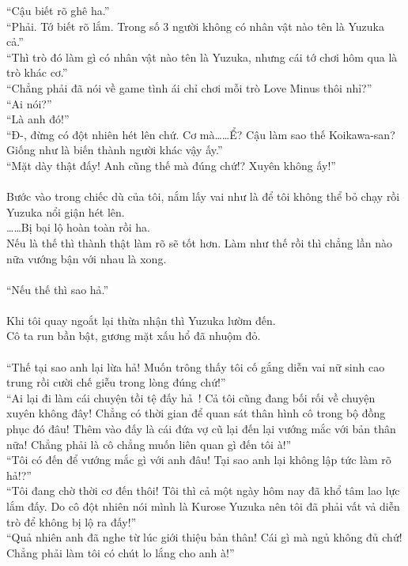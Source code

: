 \documentclass[12pt,a4paper, twosides]{book}
\begin{document}
“Cậu biết rõ ghê ha.”\\
“Phải. Tớ biết rõ lắm. Trong số 3 người không có nhân vật nào tên là Yuzuka cả.”\\
“Thì trò đó làm gì có nhân vật nào tên là Yuzuka, nhưng cái tớ chơi hôm qua là trò khác cơ.”\\
“Chẳng phải đã nói về game tình ái chỉ chơi mỗi trò Love Minus thôi nhỉ?”\\
“Ai nói?”\\
“Là anh đó!”\\
“Đ-, đừng có đột nhiên hét lên chứ. Cơ mà……Ể? Cậu làm sao thế Koikawa-san? Giống như là biến thành người khác vậy ấy.”\\
“Mặt dày thật đấy! Anh cũng thế mà đúng chứ!? Xuyên không ấy!”\\
\\
Bước vào trong chiếc dù của tôi, nắm lấy vai như là để tôi không thể bỏ chạy rồi Yuzuka nổi giận hét lên.\\
……Bị bại lộ hoàn toàn rồi ha.\\
Nếu là thế thì thành thật làm rõ sẽ tốt hơn. Làm như thế rồi thì chẳng lần nào nữa vướng bận với nhau là xong.\\
\\
“Nếu thế thì sao hả.”\\
\\
Khi tôi quay ngoắt lại thừa nhận thì Yuzuka lườm đến.\\
Cô ta run bần bật, gương mặt xấu hổ đã nhuộm đỏ.\\
\\
“Thế tại sao anh lại lừa hả! Muốn trông thấy tôi cố gắng diễn vai nữ sinh cao trung rồi cười chế giễu trong lòng đúng chứ!”\\
“Ai lại đi làm cái chuyện tồi tệ đấy hả~! Cả tôi cũng đang bối rối về chuyện xuyên không đây! Chẳng có thời gian để quan sát thân hình cô trong bộ đồng phục đó đâu! Thêm vào đấy là cái đứa vợ cũ lại đến lại vướng mắc với bản thân nữa! Chẳng phải là cô chẳng muốn liên quan gì đến tôi à!”\\
“Tôi có đến để vướng mắc gì với anh đâu! Tại sao anh lại không lập tức làm rõ hả!?”\\
“Tôi đang chờ thời cơ đến thôi! Tôi thì cả một ngày hôm nay đã khổ tâm lao lực lắm đấy. Do cô đột nhiên nói mình là Kurose Yuzuka nên tôi đã phải vất vả diễn trò để không bị lộ ra đấy!”\\
“Quả nhiên anh đã nghe từ lúc giới thiệu bản thân! Cái gì mà ngủ không đủ chứ! Chẳng phải làm tôi có chút lo lắng cho anh à!”\\
\end{document}
